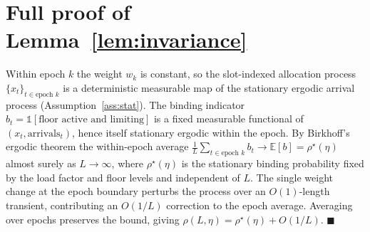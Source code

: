 \documentclass[conference]{IEEEtran}
\theoremstyle{definition}
\theoremstyle{remark}
\newcommand{\Ep}{L}
\newcommand{\rhobind}{\rho}
\newcommand{\load}{\eta}
\newcommand{\alloc}{x}
\newcommand{\wt}{w}
\newcommand{\bindind}{b}
\newcommand{\E}{\mathbb{E}}
\newcommand{\ind}{\mathbb{1}}
\begin{document}
\section{Full proof of Lemma~\ref{lem:invariance}}\label{app:invariance}
Within epoch $k$ the weight $\wt_k$ is constant, so the slot-indexed allocation process $\{\alloc_t\}_{t\in\text{epoch }k}$ is a deterministic measurable map of the stationary ergodic arrival process (Assumption~\ref{ass:stat}). The binding indicator $\bindind_t=\ind[\text{floor active and limiting}]$ is a fixed measurable functional of $(\alloc_t,\text{arrivals}_t)$, hence itself stationary ergodic within the epoch. By Birkhoff's ergodic theorem the within-epoch average $\tfrac1\Ep\sum_{t\in\text{epoch }k}\bindind_t\to\E[\bindind]=\rhobind^\star(\load)$ almost surely as $\Ep\to\infty$, where $\rhobind^\star(\load)$ is the stationary binding probability fixed by the load factor and floor levels and independent of $\Ep$. The single weight change at the epoch boundary perturbs the process over an $O(1)$-length transient, contributing an $O(1/\Ep)$ correction to the epoch average. Averaging over epochs preserves the bound, giving $\rhobind(\Ep,\load)=\rhobind^\star(\load)+O(1/\Ep)$. \hfill$\blacksquare$
\end{document}
